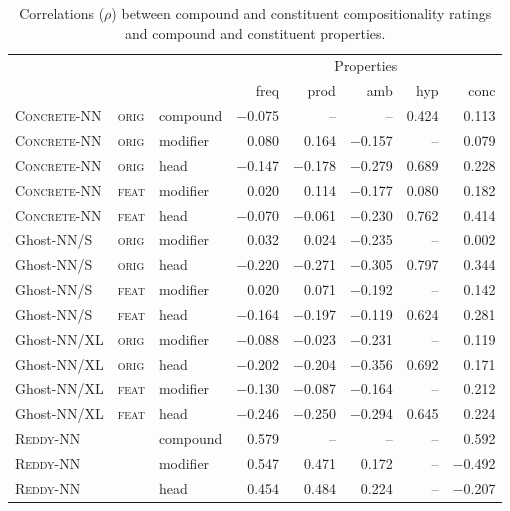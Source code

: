 \documentclass[output=paper,colorlinks,citecolor=brown]{langscibook}
\begin{document}
\begin{table}[p]
\small
\caption{Correlations ($\rho$) between compound and constituent compositionality ratings and compound and constituent properties.}
\label{tab:corr-comp-properties}
 \begin{tabular}{lllrrrrr}
  \lsptoprule
    & & & \multicolumn{5}{c}{Properties} \\\cmidrule(lr){4-8}
    & & & freq & prod & amb & hyp & conc \\
    \midrule

    {\textsc{Concrete-NN}} & \textsc{orig} & compound & −0.075 & -- & -- & 0.424 & 0.113 \\
    {\textsc{Concrete-NN}} & \textsc{orig} & modifier  & 0.080 & 0.164 & −0.157 & -- & 0.079 \\
    {\textsc{Concrete-NN}} & \textsc{orig} & head & −0.147 & −0.178 & −0.279 & \cellcolor{lred} 0.689 & 0.228 \\ 

    {\textsc{Concrete-NN}} & \textsc{feat} & modifier & 0.020 & 0.114 & −0.177 & 0.080 & 0.182 \\
    {\textsc{Concrete-NN}} & \textsc{feat} & head & −0.070 & −0.061 & −0.230 & \cellcolor{lred} 0.762 & \cellcolor{lred} 0.414 \\ 
    {Ghost-NN/S} & \textsc{orig} & modifier & 0.032 & 0.024 & −0.235 & -- & 0.002 \\
    {Ghost-NN/S} & \textsc{orig} & head & −0.220 & −0.271 & −0.305 & \cellcolor{lred} 0.797 & 0.344 \\
      
    {Ghost-NN/S} & \textsc{feat} & modifier  & 0.020 & 0.071 & −0.192 & -- & 0.142 \\
    {Ghost-NN/S} & \textsc{feat} & head & −0.164 & −0.197 & −0.119 & \cellcolor{lred} 0.624 & 0.281 \\ 

    {Ghost-NN/XL} & \textsc{orig} & modifier & −0.088 & −0.023 & −0.231 & -- & 0.119 \\
    {Ghost-NN/XL} & \textsc{orig} & head & −0.202 & −0.204 & −0.356 & \cellcolor{lred} 0.692 & 0.171 \\
      
    {Ghost-NN/XL} & \textsc{feat} & modifier & −0.130 & −0.087 & −0.164 & -- & 0.212 \\
    {Ghost-NN/XL} & \textsc{feat} & head & −0.246 & −0.250 & −0.294 & \cellcolor{lred} 0.645 & 0.224 \\ 
    {\textsc{Reddy-NN}} & & compound & \cellcolor{lred} 0.579 & -- & -- & -- & \cellcolor{lred} 0.592 \\
    {\textsc{Reddy-NN}} & & modifier  & \cellcolor{lred} 0.547 & \cellcolor{lred} 0.471 & 0.172 & -- & \cellcolor{lred} −0.492 \\
    {\textsc{Reddy-NN}} & & head & \cellcolor{lred} 0.454 & \cellcolor{lred} 0.484 & 0.224 & -- & −0.207 \\ 


\end{tabular}
\end{table}
\end{document}
